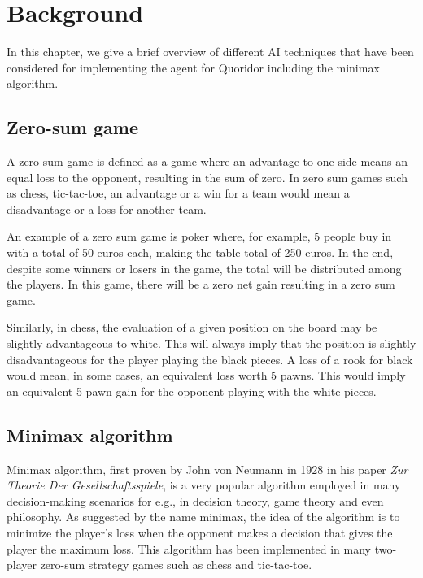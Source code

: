 \chapter{Background}
\label{background}

In this chapter, we give a brief overview of different \ac{AI} techniques that have been considered for implementing the agent for Quoridor including the minimax algorithm.

\section{Zero-sum game}
A zero-sum game is defined as a game where an advantage to one side means an equal loss to the opponent, resulting in the sum of zero. In zero sum games such as chess, tic-tac-toe, an advantage or a win for a team would mean a disadvantage or a loss for another team. 

An example of a zero sum game is poker where, for example, 5 people buy in with a total of 50 euros each, making the table total of 250 euros. In the end, despite some winners or losers in the game, the total will be distributed among the players. In this game, there will be a zero net gain resulting in a zero sum game.

Similarly, in chess, the evaluation of a given position on the board may be slightly advantageous to white. This will always imply that the position is slightly disadvantageous for the player playing the black pieces. A loss of a rook for black would mean, in some cases, an equivalent loss worth 5 pawns. This would imply an equivalent 5 pawn gain for the opponent playing with the white pieces.


\section{Minimax algorithm}

Minimax algorithm, first proven by John von Neumann in 1928 in his paper \textit{Zur Theorie Der Gesellschaftsspiele}, is a very popular algorithm employed in many decision-making scenarios for e.g., in decision theory, game theory and even philosophy. As suggested by the name minimax, the idea of the algorithm is to minimize the player's loss when the opponent makes a decision that gives the player the maximum loss. This algorithm has been implemented in many two-player zero-sum strategy games such as chess and tic-tac-toe.


